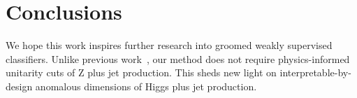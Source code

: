 \section{Conclusions}\label{sec:conclusions}

We hope this work inspires further research into groomed weakly
supervised classifiers. Unlike previous
work~\cite{TPC:1987-A-Comprehensive-Survey-of-Gaussian-Processes-for-Resonance-Searches-September-21-2026},
our method does not require physics-informed unitarity cuts of Z plus
jet production. This sheds new light on interpretable-by-design
anomalous dimensions of Higgs plus jet production.

